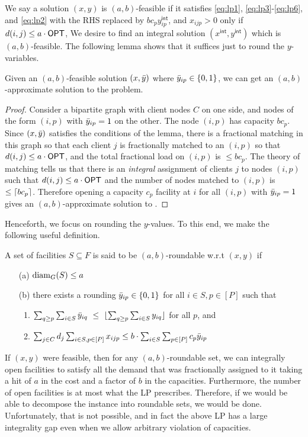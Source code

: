 \noindent		
We say a solution $(x,y)$ is $(a,b)$-feasible if it satisfies \eqref{eq:lp1}, \eqref{eq:lp3}-\eqref{eq:lp6}, and \eqref{eq:lp2} with the RHS replaced by $bc_py^\mathsf{int}_{ip}$, and $x_{ijp} > 0$ only if $d(i,j) \leq a\cdot \mathsf{OPT}$,
We desire to find an integral solution $(x^\mathsf{int},y^\mathsf{int})$ which is $(a,b)$-feasible.
The following lemma shows that it suffices just to round the $y$-variables.
\begin{claim}
Given an $(a,b)$-feasible solution $(x,\bar{y})$ where $\bar{y}_{ip}\in \{0,1\}$,
we can get  an $(a,b)$-approximate solution to the \mckc problem.
\end{claim}
\begin{proof}
Consider a bipartite graph with client nodes $C$ on one side, and nodes of the form $(i,p)$ with $\bar{y}_{ip} = 1$ on the other. The node $(i,p)$ has capacity $bc_p$.
Since $(x,\bar{y})$ satisfies the conditions of the lemma, there is a fractional matching in this graph so that each client $j$  is fractionally matched to an $(i,p)$ so that $d(i,j)\leq a\cdot \mathsf{OPT}$,
and the total fractional load on $(i,p)$ is $\leq bc_p$. The theory of matching tells us that there is an {\em integral} assignment of clients $j$ to nodes $(i,p)$ such that $d(i,j)\leq a\cdot\mathsf{OPT}$
and the number of nodes matched to $(i,p)$ is $\leq \lceil bc_p\rceil$. Therefore opening a capacity $c_p$ facility at $i$ for all $(i,p)$ with $\bar{y}_{ip} = 1$ gives an $(a,b)$-approximate solution to \mckc.
\end{proof}
\noindent
Henceforth, we focus on rounding the $y$-values. To this end, we make the following useful definition.
\begin{definition}\label{def:rnding-mkc}
	A set of facilities $S\subseteq F$ is said to be $(a,b)$-roundable w.r.t $(x,y)$ if
	\begin{itemize}[noitemsep]
		\item[(a)] $\mathrm{diam}_G(S) \leq a$
		\item[(b)] there exists a rounding $\bar{y}_{ip} \in \{0,1\}$ for all $i \in S, p\in [P]$ such that
		\begin{enumerate}
			\item $\sum_{q \geq p} \sum_{i\in S} \bar{y}_{iq} ~\leq~ \lfloor\sum_{q \geq p}\sum_{i\in S} y_{iq}\rfloor$ for all $p$, and
			\item $\sum_{j\in C} d_j \sum_{i\in S,p\in [P]} x_{ijp} \leq b\cdot \sum_{i\in S} \sum_{p\in [P]} c_p \bar{y}_{ip}$
		\end{enumerate}
	\end{itemize}
\end{definition}
\noindent
If $(x,y)$ were feasible, then for any $(a,b)$-roundable set, we can integrally open facilities to satisfy all the demand that was fractionally assigned to it taking a hit of $a$ in the cost and a factor of $b$ in the capacities. Furthermore, the number of open facilities is at most what the LP prescribes. Therefore, if we would be able to decompose the instance into roundable sets, we would be done.
Unfortunately, that is not possible, and in fact the above LP has a large integrality gap even when we allow arbitrary violation of capacities.

